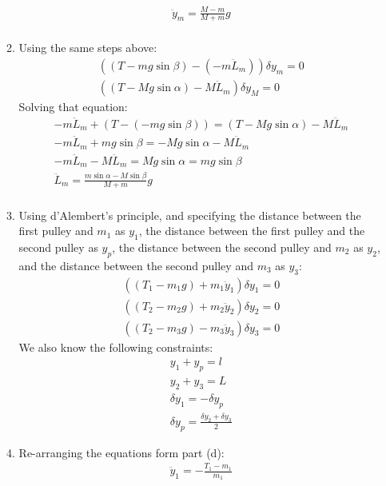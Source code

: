 \documentclass[12pt]{article}
\begin{document}
\begin{enumerate}
\begin{enumerate}
\begin{gather*}
                \ddot{y}_m=\frac{M-m}{M+m}g\\
            \end{gather*}
            \item
            Using the same steps above:
            \begin{gather*}
                ((T-mg\sin\beta)-(-m\ddot{L}_m))\delta y_m=0\\
                ((T-Mg\sin\alpha)-M\ddot{L}_m)\delta y_M=0
            \end{gather*}
            Solving that equation:
            \begin{gather*}
                -m\ddot{L}_m+(T-(-mg\sin\beta))=(T-Mg\sin\alpha)-M\ddot{L}_m\\
                -m\ddot{L}_m+mg\sin\beta=-Mg\sin\alpha-M\ddot{L}_m\\
                -m\ddot{L}_m-M\ddot{L}_m=Mg\sin\alpha=mg\sin\beta\\
                \ddot{L}_m=\frac{m\sin\alpha-M\sin\beta}{M+m}g\\
            \end{gather*}
            \item
            Using d'Alembert's principle, and specifying the distance between the first pulley and $m_1$ as $y_1$, the distance between the first pulley and the second pulley as $y_p$, the distance between the second pulley and $m_2$ as $y_2$, and the distance between the second pulley and $m_3$ as $y_3$:
            \begin{gather*}
                ((T_1-m_1 g)+m_1\ddot{y}_1)\delta y_1=0\\
                ((T_2-m_2 g)+m_2\ddot{y}_2)\delta y_2=0\\
                ((T_2-m_3 g)-m_3\ddot{y}_3)\delta y_3=0
            \end{gather*}
            We also know the following constraints:
            \begin{gather*}
                y_1+y_p=l\\
                y_2+y_3=L\\
                \delta y_1=-\delta y_p\\
                \delta y_p=\frac{\delta y_2+\delta y_3}{2}
            \end{gather*}
            \item
            Re-arranging the equations form part (d):
            \begin{gather*}
                \ddot{y}_1=-\frac{T_1-m_1}{m_1}\\

\end{gather*}
\end{enumerate}
\end{enumerate}
\end{document}
